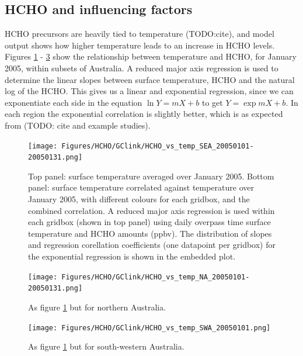   \subsection{HCHO and influencing factors}
  \label{Model:Analysis:HCHO}
    
    HCHO precursors are heavily tied to temperature (TODO:cite), and model output shows how higher temperature leads to an increase in HCHO levels.
    Figures \ref{Model:Analysis:HCHO:fig_hcho_vs_temp_SEA_200501} - \ref{Model:Analysis:HCHO:fig_hcho_vs_temp_SWA_200501} show the relationship between temperature and HCHO, for January 2005, within subsets of Australia.
    A reduced major axis regression is used to determine the linear slopes between surface temperature, HCHO and the natural log of the HCHO.
    This gives us a linear and exponential regression, since we can exponentiate each side in the equation $\ln{Y} = m{X}+b$ to get ${Y} = \exp{m{X}+b}$.
    In each region the exponential correlation is slightly better, which is as expected from (TODO: cite and example studies).
    
    
    \begin{figure}
      \texttt{[image: Figures/HCHO/GClink/HCHO\_vs\_temp\_SEA\_20050101-20050131.png]}
      \caption{%
        Top panel: surface temperature averaged over January 2005.
        Bottom panel: surface temperature correlated against temperature over January 2005, with different colours for each gridbox, and the combined correlation. 
        A reduced major axis regression is used within each gridbox (shown in top panel) using daily overpass time surface temperature and HCHO amounts (ppbv).
        The distribution of slopes and regression corellation coefficients (one datapoint per gridbox) for the exponential regression is shown in the embedded plot.
      }
      \label{Model:Analysis:HCHO:fig_hcho_vs_temp_SEA_200501}
    \end{figure}
    
    \begin{figure}
      \texttt{[image: Figures/HCHO/GClink/HCHO\_vs\_temp\_NA\_20050101-20050131.png]}
      \caption{%
        As figure \ref{Model:Analysis:HCHO:fig_hcho_vs_temp_SEA_200501} but for northern Australia.
      }
      \label{Model:Analysis:HCHO:fig_hcho_vs_temp_NA_200501}
    \end{figure}
    
    \begin{figure}
      \texttt{[image: Figures/HCHO/GClink/HCHO\_vs\_temp\_SWA\_20050101.png]}
      \caption{%
        As figure \ref{Model:Analysis:HCHO:fig_hcho_vs_temp_SEA_200501} but for south-western Australia.
      }
      \label{Model:Analysis:HCHO:fig_hcho_vs_temp_SWA_200501}
    \end{figure}
    
